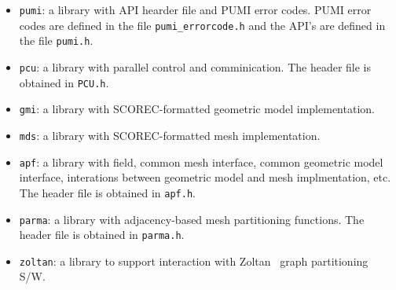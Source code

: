 \begin{itemize}
\item \texttt{pumi}: a library with API hearder file and PUMI error codes. PUMI error codes are defined in the file \texttt{pumi\_errorcode.h} and the API's are defined in the file \texttt{pumi.h}.
\item \texttt{pcu}: a library with parallel control and comminication. The header file is obtained in \texttt{PCU.h}.
\item \texttt{gmi}: a library with SCOREC-formatted geometric model implementation. 
\item \texttt{mds}: a library with SCOREC-formatted mesh implementation. 
\item \texttt{apf}: a library with field, common mesh interface, common geometric model interface, interations between geometric model and mesh implmentation, etc. The header file is obtained in \texttt{apf.h}.
\item \texttt{parma}: a library with adjacency-based mesh partitioning functions. The header file is obtained in \texttt{parma.h}.
\item \texttt{zoltan}: a library to support interaction with Zoltan~\cite{ZoltanIsorropiaOverview2012, ZoltanOverviewArticle2002} graph partitioning S/W.
\end{itemize}

